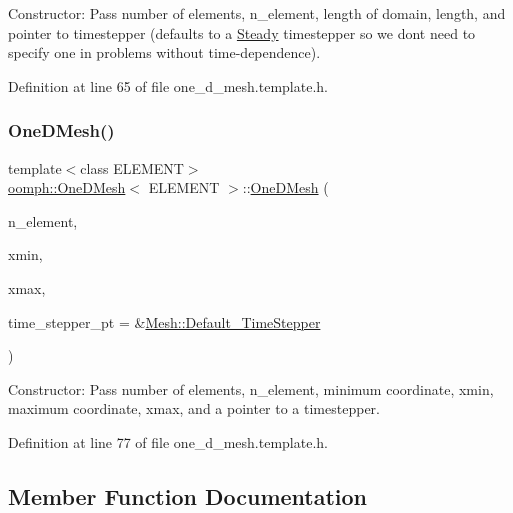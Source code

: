 Constructor\+: Pass number of elements, n\+\_\+element, length of domain, length, and pointer to timestepper (defaults to a \hyperlink{classoomph_1_1Steady}{Steady} timestepper so we don\textquotesingle{}t need to specify one in problems without time-\/dependence). 



Definition at line 65 of file one\+\_\+d\+\_\+mesh.\+template.\+h.

\mbox{\label{classoomph_1_1OneDMesh_a1a8b9e65226f10dfbb48fe2362e83014}} 
\subsubsection{\texorpdfstring{One\+D\+Mesh()}{OneDMesh()}\hspace{0.1cm}{\footnotesize\ttfamily [2/2]}}
{\footnotesize\ttfamily template$<$class E\+L\+E\+M\+E\+NT$>$ \\
\hyperlink{classoomph_1_1OneDMesh}{oomph\+::\+One\+D\+Mesh}$<$ E\+L\+E\+M\+E\+NT $>$\+::\hyperlink{classoomph_1_1OneDMesh}{One\+D\+Mesh} (\begin{DoxyParamCaption}\item[{const unsigned \&}]{n\+\_\+element,  }\item[{const double \&}]{xmin,  }\item[{const double \&}]{xmax,  }\item[{\hyperlink{classoomph_1_1TimeStepper}{Time\+Stepper} $\ast$}]{time\+\_\+stepper\+\_\+pt = {\ttfamily \&\hyperlink{classoomph_1_1Mesh_a12243d0fee2b1fcee729ee5a4777ea10}{Mesh\+::\+Default\+\_\+\+Time\+Stepper}} }\end{DoxyParamCaption})\hspace{0.3cm}{\ttfamily [inline]}}



Constructor\+: Pass number of elements, n\+\_\+element, minimum coordinate, xmin, maximum coordinate, xmax, and a pointer to a timestepper. 



Definition at line 77 of file one\+\_\+d\+\_\+mesh.\+template.\+h.



\subsection{Member Function Documentation}
\mbox{\label{classoomph_1_1OneDMesh_a5a1a27eaa9d58bb85facb617127e9f0a}} 
